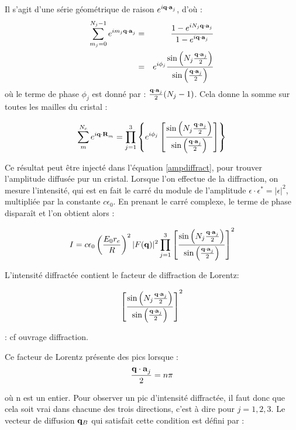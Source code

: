 Il s'agit d'une série géométrique de raison $e^{i \mathbf{q\cdot a}_j}$, d'où :
\begin{eqnarray}
    \sum_{m_j = 0}^{N_j - 1} e^{i m_j \mathbf{q\cdot a}_j} & = &
    \frac{1 - e^{i N_j \mathbf{q\cdot a}_j}}{1 - e^{i \mathbf{q \cdot a}_j}} \\
    & = & e^{i \phi_j} \frac{\sin \left( N_j \frac{\mathbf{q\cdot a}_j}{2} \right) }{\sin \left( \frac{\mathbf{q\cdot a}_j}{2} \right)}
\end{eqnarray}
où le terme de phase $\phi_j$ est donné par : $\frac{\mathbf{q\cdot a}_j}{2} (N_j
-1)$. Cela donne la somme sur toutes les mailles du cristal :

\begin{equation}
    \sum_m^{N_c} e^{i\mathbf{q\cdot R}_m} = \prod_{j=1}^3 \left\{ e^{i\phi_j} \left[ \frac{\sin \left(N_j \frac{\mathbf{q\cdot a}_j}{2}
    \right)}{\sin \left(\frac{\mathbf{q\cdot a}_j}{2} \right)} \right] \right\}
    \label{sommecristal}
\end{equation}

Ce résultat peut être injecté dans l'équation \ref{ampdiffract}, pour trouver
l'amplitude diffusée pur un cristal. Lorsque l'on effectue de la diffraction, on
mesure l'intensité, qui est en fait le carré du module de l'amplitude
$\epsilon \cdot \epsilon^* = |\epsilon|^2$, multipliée par la constante
$c\epsilon_0$. En prenant le carré complexe, le terme de phase disparaît et l'on
obtient alors :

\begin{equation}
    I = c\epsilon_0 \left( \frac{E_0 r_e}{R} \right)^2 |F(\mathbf{q})|^2
    \prod_{j=1}^3 \left[ \frac{\sin \left(N_j \frac{\mathbf{q\cdot a}_j}{2} \right)}{\sin \left( \frac{\mathbf{q\cdot a}_j}{2}\right)} \right]^2
\end{equation}

L'intensité diffractée contient le facteur de diffraction de Lorentz:

\begin{equation}
    \left[ \frac{\sin \left(N_j \frac{\mathbf{q\cdot a}_j}{2} \right)}{\sin \left( \frac{\mathbf{q\cdot a}_j}{2}\right)} \right]^2
\end{equation}

\TODO: cf ouvrage diffraction.

Ce facteur de Lorentz présente des pics lorsque :
\begin{equation}
    \frac{\mathbf{q \cdot a}_j}{2} = n \pi
\end{equation}

où n est un entier. Pour observer un pic d'intensité diffractée, il faut donc
que cela soit vrai dans chacune des trois directions, c'est à dire pour
$j = 1,2,3$. Le vecteur de diffusion $\mathbf{q}_B$ qui satisfait cette condition
est défini par :

